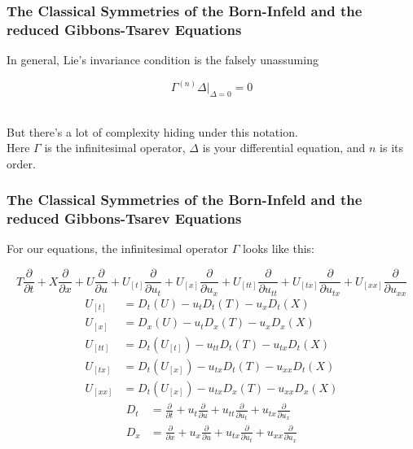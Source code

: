 \documentclass{beamer}
\begin{document}
\begin{frame}
    \frametitle{The Classical Symmetries of the Born-Infeld and the reduced Gibbons-Tsarev Equations}
        In general, Lie's invariance condition is the falsely unassuming\\
        \vspace*{0.125in}
        \begin{Large}$$\Gamma^{(n)}\Delta |_{\Delta=0} = 0$$\end{Large}\\
        \vspace*{0.125in}
        But there's a lot of complexity hiding under this notation. \\
        \vspace*{0.125in}
        Here $\Gamma$ is the infinitesimal operator, $\Delta$ is your differential equation, and $n$ is its order.
\end{frame}


\begin{frame}
    \frametitle{The Classical Symmetries of the Born-Infeld and the reduced Gibbons-Tsarev Equations}
        For our equations, the infinitesimal operator $\Gamma$ looks like this:
        \vspace*{0.125in}
        \begin{small}
            $$T\frac{\partial}{\partial t} + X\frac{\partial}{\partial x} + U\frac{\partial}{\partial u} + U_{[t]}\frac{\partial}{\partial u_t} + U_{[x]}\frac{\partial}{\partial u_x} + U_{[tt]}\frac{\partial}{\partial u_{tt}} + U_{[tx]}\frac{\partial}{\partial u_{tx}} + U_{[xx]}\frac{\partial}{\partial u_{xx}}$$
            \begin{align*}
                U_{[t]} &= D_t(U)-u_tD_t(T)-u_xD_t(X) \\
                U_{[x]} &= D_x(U)-u_tD_x(T)-u_xD_x(X) \\
                U_{[tt]} &= D_t(U_{[t]})-u_{tt}D_t(T)-u_{tx}D_t(X) \\
                U_{[tx]} &= D_t(U_{[x]})-u_{tx}D_t(T)-u_{xx}D_t(X) \\
                U_{[xx]} &= D_t(U_{[x]})-u_{tx}D_x(T)-u_{xx}D_x(X)
            \end{align*}
            \begin{align*}
                D_t &= \frac{\partial}{\partial t} + u_t\frac{\partial}{\partial u} + u_{tt}\frac{\partial}{\partial u_t} + u_{tx}\frac{\partial}{\partial u_x} \\
                D_x &= \frac{\partial}{\partial x} + u_x\frac{\partial}{\partial u} + u_{tx}\frac{\partial}{\partial u_t} + u_{xx}\frac{\partial}{\partial u_x}
            \end{align*}
        \end{small}
    \end{frame}
\end{document}
